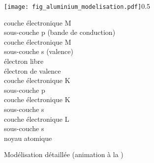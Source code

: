 \begin{center}
\begin{figure}[h] %
\startcstep %
	\begin{minipage}{.69\linewidth}
		\begin{annotate}
			{\texttt{[image: fig\_aluminium\_modelisation.pdf]}}{0.5} %

		\end{annotate} 
	\end{minipage}
\hfill
	\begin{minipage}{.28\linewidth}
couche électronique M\\sous-couche p (bande de conduction)\\
couche électronique M\\sous-couche s (valence) \\
électron libre\\
électron de valence\\
couche électronique K\\sous-couche p\\
couche électronique K\\sous-couche s\\
couche électronique L\\sous-couche s\\
noyau atomique
	\end{minipage}
	\caption{Modélisation détaillée (animation à la )}
	\label{fig:aluminium_modelisation}
\end{figure}
\end{center}

